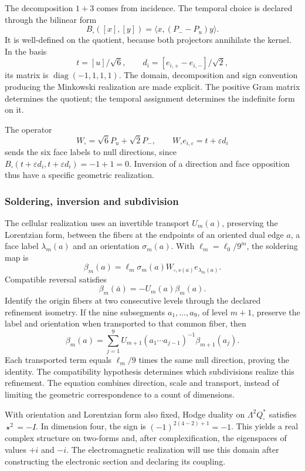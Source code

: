 The decomposition \(1+3\) comes from incidence. The temporal choice
is declared through the bilinear form
\[
 B_\square([x],[y])=\langle x,(P_--P_u)y\rangle.
\]
It is well-defined on the quotient, because both projectors annihilate the
kernel. In the basis
\[
 t=[u]/\sqrt6,\qquad
 d_i=[e_{i,+}-e_{i,-}]/\sqrt2,
\]
its matrix is \(\operatorname{diag}(-1,1,1,1)\). The domain,
decomposition and sign convention producing
the Minkowski realization are made explicit. The positive Gram matrix determines the quotient;
the temporal assignment determines the indefinite form on it.

The operator
\[
 W_\square=\sqrt6P_u+\sqrt2P_-,\qquad
 W_\square e_{i,\varepsilon}=t+\varepsilon d_i
\]
sends the six face labels to null directions, since
\(B_\square(t+\varepsilon d_i,t+\varepsilon d_i)=-1+1=0\).
Inversion of a direction and face opposition thus have
a specific geometric realization.

\subsubsection{Soldering, inversion and subdivision}

The cellular realization uses an invertible transport \(U_m(a)\),
preserving the Lorentzian form, between the fibers at the endpoints of
an oriented dual edge \(a\), a face
label \(\lambda_m(a)\) and an orientation \(\sigma_m(a)\).
With \(\ell_m=\ell_0/9^m\), the soldering map is
\[
 \beta_m(a)=\ell_m\sigma_m(a)
 W_{\square,s(a)}e_{\lambda_m(a)}.
\]
Compatible reversal satisfies
\[
 \beta_m(\bar a)=-U_m(a)\beta_m(a).
\]
Identify the origin fibers at two consecutive levels through
the declared refinement isometry. If the nine subsegments
\(a_1,\ldots,a_9\), of level \(m+1\), preserve the label
and orientation when transported to that common fiber, then
\begin{equation}
 \beta_m(a)=\sum_{j=1}^9
 U_{m+1}(a_1\cdots a_{j-1})^{-1}\beta_{m+1}(a_j).
 \label{x_reciprocidad:eq:soldadura-refinamiento}
\end{equation}
Each transported term equals \(\ell_m/9\) times the same
null direction, proving the identity. The compatibility
hypothesis determines which subdivisions realize this refinement.
The equation combines direction, scale and transport, instead of limiting
the geometric correspondence to a count of dimensions.

With orientation and Lorentzian form also fixed, Hodge
duality on \(\Lambda^2Q_\square^*\) satisfies \(\star^2=-I\).
In dimension four, the sign is \((-1)^{2(4-2)+1}=-1\).
This yields a real complex structure on two-forms and,
after complexification, the eigenspaces of values \(+i\) and
\(-i\). The electromagnetic realization will use this domain
after constructing the electronic section and declaring its coupling.

